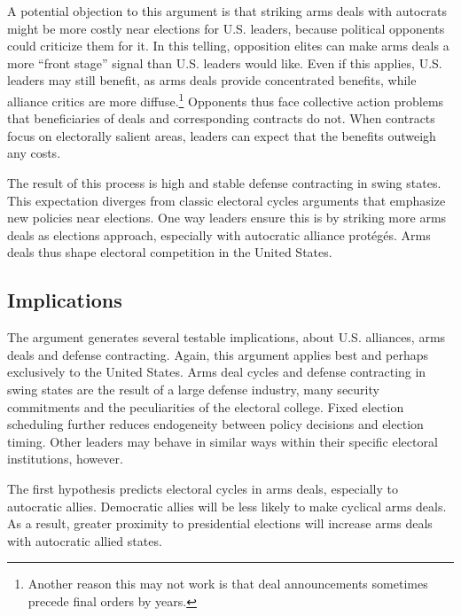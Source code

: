 \documentclass[12pt]{article}
\begin{document}
A potential objection to this argument is that striking arms deals with autocrats might be more costly near elections for U.S. leaders, because political opponents could criticize them for it. 
In this telling, opposition elites can make arms deals a more ``front stage'' signal than U.S. leaders would like. 
Even if this applies, U.S. leaders may still benefit, as arms deals provide concentrated benefits, while alliance critics are more diffuse.\footnote{Another reason this may not work is that deal announcements sometimes precede final orders by years.}
Opponents thus face collective action problems that beneficiaries of deals and corresponding contracts do not. 
When contracts focus on electorally salient areas, leaders can expect that the benefits outweigh any costs. 


The result of this process is high and stable defense contracting in swing states.
This expectation diverges from classic electoral cycles arguments that emphasize new policies near elections. 
One way leaders ensure this is by striking more arms deals as elections approach, especially with autocratic alliance prot{\'e}g{\'e}s.
Arms deals thus shape electoral competition in the United States. 



\subsection{Implications}



The argument generates several testable implications, about U.S. alliances, arms deals and defense contracting. 
Again, this argument applies best and perhaps exclusively to the United States.  
Arms deal cycles and defense contracting in swing states are the result of a large defense industry, many security commitments and the peculiarities of the electoral college. 
Fixed election scheduling further reduces endogeneity between policy decisions and election timing. 
Other leaders may behave in similar ways within their specific electoral institutions, however. 


The first hypothesis predicts electoral cycles in arms deals, especially to autocratic allies.
Democratic allies will be less likely to make cyclical arms deals. 
As a result, greater proximity to presidential elections will increase arms deals with autocratic allied states. 
\end{document}
